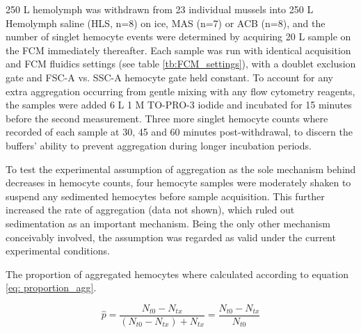 250 \micro L hemolymph was withdrawn from 23 individual mussels into 250 \micro L Hemolymph saline (HLS, n=8) on ice, MAS (n=7) or ACB (n=8), and the number of singlet hemocyte events were determined by acquiring 20 \micro L sample on the FCM immediately thereafter. Each sample was run with identical acquisition and FCM fluidics settings (see table \ref{tb:FCM_settings}), with a doublet exclusion gate and FSC-A vs. SSC-A hemocyte gate held constant. To account for any extra aggregation occurring from gentle mixing with any flow cytometry reagents, the samples were added 6 \micro L 1 \micro M TO-PRO-3 iodide and incubated for 15 minutes before the second measurement. Three more singlet hemocyte counts where recorded of each sample at 30, 45 and 60 minutes post-withdrawal, to discern the buffers' ability to prevent aggregation during longer incubation periods.

To test the experimental assumption of aggregation as the sole mechanism behind decreases in hemocyte counts, four hemocyte samples were moderately shaken to suspend any sedimented hemocytes before sample acquisition. This further increased the rate of aggregation (data not shown), which ruled out sedimentation as an important mechanism. Being the only other mechanism conceivably involved, the assumption was regarded as valid under the current experimental conditions.

The proportion of aggregated hemocytes where calculated according to equation \ref{eq: proportion_agg}.

\begin{equation}
    \label{eq: proportion_agg}
    \hat{p} = \dfrac{N_{t0} - N_{tx}}{(N_{t0} - N_{tx}) + N_{tx}} = \dfrac{N_{t0} - N_{tx}}{N_{t0}}
\end{equation}

